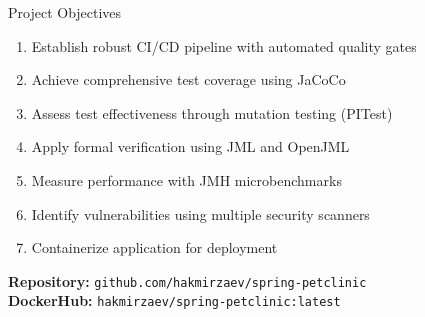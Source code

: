 \documentclass[aspectratio=169]{beamer}
\begin{document}
\begin{frame}{Project Objectives}
\begin{enumerate}
    \item Establish robust CI/CD pipeline with automated quality gates
    \item Achieve comprehensive test coverage using JaCoCo
    \item Assess test effectiveness through mutation testing (PITest)
    \item Apply formal verification using JML and OpenJML
    \item Measure performance with JMH microbenchmarks
    \item Identify vulnerabilities using multiple security scanners
    \item Containerize application for deployment
\end{enumerate}

\vspace{0.5cm}
\begin{center}
\textbf{Repository:} \texttt{github.com/hakmirzaev/spring-petclinic}\\
\textbf{DockerHub:} \texttt{hakmirzaev/spring-petclinic:latest}
\end{center}
\end{frame}
\end{document}
